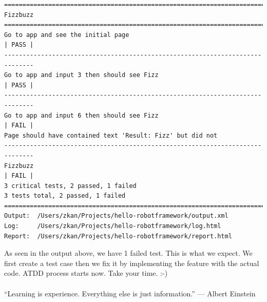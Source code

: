 \documentclass{article}
\begin{document}
\begin{verbatim}
==============================================================================
Fizzbuzz
==============================================================================
Go to app and see the initial page                                    | PASS |
------------------------------------------------------------------------------
Go to app and input 3 then should see Fizz                            | PASS |
------------------------------------------------------------------------------
Go to app and input 6 then should see Fizz                            | FAIL |
Page should have contained text 'Result: Fizz' but did not
------------------------------------------------------------------------------
Fizzbuzz                                                              | FAIL |
3 critical tests, 2 passed, 1 failed
3 tests total, 2 passed, 1 failed
==============================================================================
Output:  /Users/zkan/Projects/hello-robotframework/output.xml
Log:     /Users/zkan/Projects/hello-robotframework/log.html
Report:  /Users/zkan/Projects/hello-robotframework/report.html
\end{verbatim}

\noindent As seen in the output above, we have 1 failed test. This is what we
expect. We first create a test case then we fix it by implementing the feature
with the actual code. ATDD process starts now. Take your time. :-) \\\\

\noindent ``Learning is experience. Everything else is just information.'' ---
Albert Einstein
\end{document}
